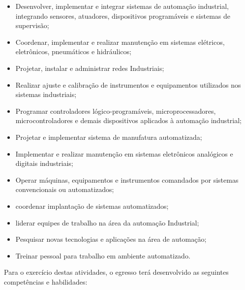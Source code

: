 \begin{itemize}
\item Desenvolver, implementar e integrar sistemas de automação industrial, integrando sensores, atuadores, dispositivos programáveis e sistemas de supervisão;

\item Coordenar, implementar e realizar manutenção em sistemas elétricos, eletrônicos, pneumáticos e hidráulicos;

\item Projetar, instalar e administrar redes Industriais;

\item Realizar ajuste e calibração de instrumentos e equipamentos utilizados nos sistemas industriais;

\item Programar controladores lógico-programáveis, microprocessadores,
 microcontroladores e demais dispositivos aplicados à automação industrial;
 
\item Projetar e implementar sistema de manufatura automatizada;

\item Implementar e realizar manutenção em sistemas eletrônicos analógicos e digitais industriais;

\item Operar máquinas, equipamentos e instrumentos comandados por sistemas convencionais ou automatizados;

\item coordenar implantação de sistemas automatizados;

\item liderar equipes de trabalho na área da automação Industrial;

\item Pesquisar novas tecnologias e aplicações na área de automação;

\item Treinar pessoal para trabalho em ambiente automatizado.

\end{itemize}

Para o exercício destas atividades, o egresso terá desenvolvido as seguintes competências e habilidades:

